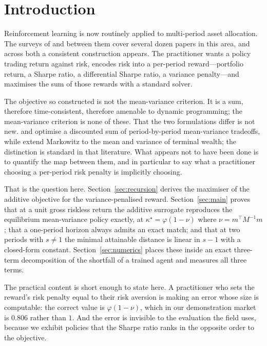 \documentclass[11pt,a4paper]{article}
\theoremstyle{plain}
\theoremstyle{definition}
\theoremstyle{remark}
\begin{document}
\section{Introduction}

Reinforcement learning is now routinely applied to multi-period asset allocation.
The surveys of \citet{bai} and \citet{hambly} between them cover several dozen
papers in this area, and across both a consistent construction appears.
The practitioner wants a policy trading return against risk, encodes risk into a
per-period reward---portfolio return, a Sharpe ratio, a differential Sharpe ratio,
a variance penalty---and maximises the sum of those rewards with a standard
solver.

The objective so constructed is not the mean-variance criterion. It is a sum,
therefore time-consistent, therefore amenable to dynamic programming; the
mean-variance criterion is none of these. That the two formulations differ is
not new. \citet{garleanu} and \citet{demiguel} optimise a discounted sum of
period-by-period mean-variance tradeoffs, while \citet{ling} extend Markowitz to
the mean and variance of terminal wealth; the distinction is standard in that
literature. What appears not to have been done is to quantify the map between
them, and in particular to say what a practitioner choosing a per-period risk
penalty is implicitly choosing.

That is the question here. Section~\ref{sec:recursion} derives the maximiser of
the additive objective for the variance-penalised reward. Section~\ref{sec:main}
proves that at a unit gross riskless return the additive surrogate reproduces the
equilibrium mean-variance policy exactly, at $\kappa^{\star}=\varphi(1-\nu)$
where $\nu=m^{\top}M^{-1}m$; that a one-period horizon always admits an exact
match; and that at two periods with $s\neq1$ the minimal attainable distance is
linear in $s-1$ with a closed-form constant. Section~\ref{sec:numerics} places
these inside an exact three-term decomposition of the shortfall of a trained
agent and measures all three terms.

The practical content is short enough to state here. A practitioner who sets the
reward's risk penalty equal to their risk aversion is making an error whose size
is computable: the correct value is $\varphi(1-\nu)$, which in our demonstration
market is $0.806$ rather than $1$. And the error is invisible to the evaluation
the field uses, because we exhibit policies that the Sharpe ratio ranks in the
opposite order to the objective.
\end{document}
